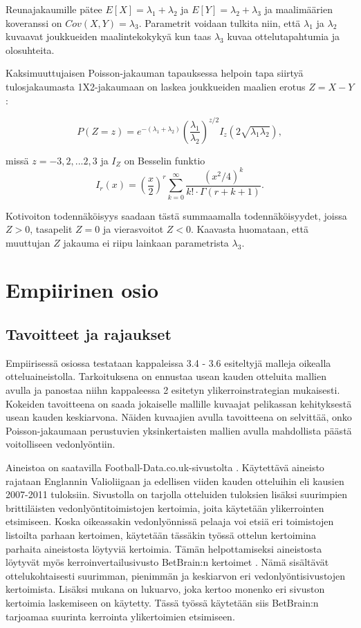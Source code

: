 \documentclass[a4paper,finnish,titlepage,12pt]{article}
\begin{document}
Reunajakaumille pätee $E[X] = \lambda_1 + \lambda_2$ ja $E[Y] = \lambda_2 + \lambda_3$ ja maalimäärien koveranssi on $Cov(X,Y) = \lambda_3$. Parametrit voidaan tulkita niin, että $\lambda_1$ ja $\lambda_2$ kuvaavat joukkueiden maalintekokykyä kun taas $\lambda_3$ kuvaa ottelutapahtumia ja olosuhteita.

Kaksimuuttujaisen Poisson-jakauman tapauksessa helpoin tapa siirtyä tulosjakaumasta 1X2-jakaumaan on laskea joukkueiden maalien erotus $Z = X - Y$:

\begin{equation}
P(Z=z) = e^{-(\lambda_1 + \lambda_2)} (\frac{\lambda_1}{\lambda_2})^{z/2} I_z (2\sqrt{\lambda_1 \lambda_2}),
\end{equation}

missä $z = -3,2,...2,3$ ja $I_Z$ on Besselin funktio
\begin{equation}
	I_r (x) = (\frac{x}{2})^r \sum_{k=0}^{\infty} \frac{(x^2/4)^k}{k! \cdot \Gamma(r + k + 1)}.
\end{equation}

Kotivoiton todennäköisyys saadaan tästä summaamalla todennäköisyydet, joissa $Z > 0$, tasapelit $Z = 0$ ja vierasvoitot $Z < 0$. Kaavasta huomataan, että muuttujan $Z$ jakauma ei riipu lainkaan parametrista $\lambda_3$.





\section{Empiirinen osio}
\subsection{Tavoitteet ja rajaukset}
Empiirisessä osiossa testataan kappaleissa 3.4 - 3.6 esiteltyjä malleja oikealla otteluaineistolla. Tarkoituksena on ennustaa usean kauden otteluita mallien avulla ja panostaa niihn kappaleessa 2 esitetyn ylikerroinstrategian mukaisesti. Kokeiden tavoitteena on saada jokaiselle mallille kuvaajat pelikassan kehityksestä usean kauden keskiarvona. Näiden kuvaajien avulla tavoitteena on selvittää, onko Poisson-jakaumaan perustuvien yksinkertaisten mallien avulla mahdollista päästä voitolliseen vedonlyöntiin.

Aineistoa on saatavilla Football-Data.co.uk-sivustolta \cite{footballdata}. Käytettävä aineisto rajataan Englannin Valioliigaan ja edellisen viiden kauden otteluihin eli kausien 2007-2011 tuloksiin. Sivustolla on tarjolla otteluiden tuloksien lisäksi suurimpien brittiläisten vedonlyöntitoimistojen kertoimia, joita käytetään ylikerrointen etsimiseen. Koska oikeassakin vedonlyönnissä pelaaja voi etsiä eri toimistojen listoilta parhaan kertoimen, käytetään tässäkin työssä ottelun kertoimina parhaita aineistosta löytyviä kertoimia. Tämän helpottamiseksi aineistosta löytyvät myös kerroinvertailusivusto BetBrain:n kertoimet \cite{betbrain}. Nämä sisältävät ottelukohtaisesti suurimman, pienimmän ja keskiarvon eri vedonlyöntisivustojen kertoimista. Lisäksi mukana on lukuarvo, joka kertoo monenko eri sivuston kertoimia laskemiseen on käytetty. Tässä työssä käytetään siis BetBrain:n tarjoamaa suurinta kerrointa ylikertoimien etsimiseen.
\end{document}

